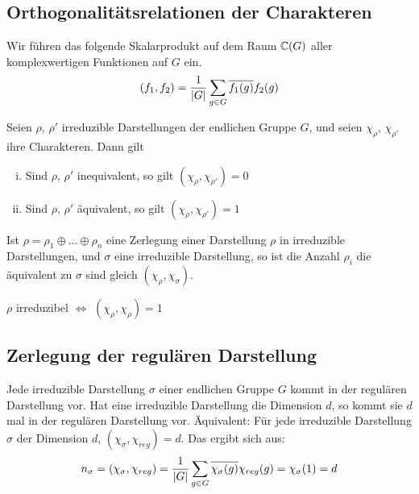 \subsection{Orthogonalitätsrelationen der Charakteren}

\begin{definition}[Skalarprodukt]
    Wir führen das folgende Skalarprodukt auf dem Raum $\mathbb{C}(G)$ aller
    komplexwertigen Funktionen auf $G$ ein.
    \begin{align*}
        (f_1,f_2) = \frac{1}{\left\vert G \right\vert} \sum_{g \in G} \overline{f_1(g)} f_2(g)
    \end{align*}
\end{definition}

\begin{satz}
    Seien $\rho$, $\rho'$ irreduzible Darstellungen der endlichen Gruppe $G$,
    und seien $\chi_\rho$, $\chi_{\rho'}$ ihre Charakteren. Dann gilt
    \begin{enumerate}[(i)]
        \item Sind $\rho$, $\rho'$ inequivalent, so gilt $(\chi_\rho,\chi_{\rho'}) = 0$
        \item Sind $\rho$, $\rho'$ äquivalent, so gilt $(\chi_\rho,\chi_{\rho'}) = 1$
    \end{enumerate}
\end{satz}

\begin{korollar}
    Ist $\rho = \rho_1 \oplus \dots \oplus \rho_n$ eine Zerlegung einer
    Darstellung $\rho$ in irreduzible Darstellungen, und $\sigma$ eine
    irreduzible Darstellung, so ist die Anzahl $\rho_i$ die äquivalent
    zu $\sigma$ sind gleich $(\chi_\rho,\chi_\sigma)$.
\end{korollar}

\begin{korollar}
    $\rho$ irreduzibel $\Leftrightarrow$ $(\chi_\rho,\chi_\rho) = 1$
\end{korollar}

\subsection{Zerlegung der regulären Darstellung}

\begin{satz}
    Jede irreduzible Darstellung $\sigma$ einer endlichen Gruppe $G$ kommt
    in der regulären Darstellung vor. Hat eine irreduzible Darstellung die
    Dimension $d$, so kommt sie $d$ mal in der regulären Darstellung vor.
    Äquivalent: Für jede irreduzible Darstellung $\sigma$ der Dimension $d$,
    $(\chi_\sigma,\chi_{reg}) = d$. Das ergibt sich aus:
    \begin{align*}
        n_\sigma = (\chi_\sigma,\chi_{reg}) = \frac{1}{\left\vert G \right\vert} \sum_{g \in G} \overline{\chi_\sigma(g)} \chi_{reg}(g)
        = \chi_\sigma (1) = d
    \end{align*}
\end{satz}

